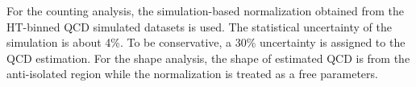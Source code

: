 For the counting analysis, the simulation-based normalization obtained from the HT-binned QCD simulated datasets is used. The statistical uncertainty of the simulation is about 4\%. To be conservative, a 30\% uncertainty is assigned to the QCD estimation. For the shape analysis, the shape of estimated QCD is from the anti-isolated region while the normalization is treated as a free parameters.














